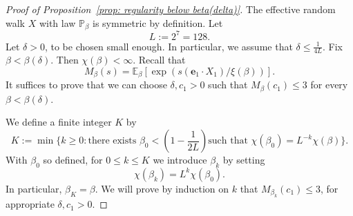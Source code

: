 \documentclass[10pt,a4paper]{amsart}
\begin{document}
\begin{proof}[Proof of Proposition~\textup{\ref{prop: regularity below beta(delta)}}]
The effective random walk $X$ with law $\mathbb P_\beta$ is symmetric by definition.
Let
\begin{equation}
    L:= 2^7 = 128.
    \end{equation}
Let $\delta>0$, to be chosen small enough. In particular, we assume that
$\delta\leq \frac{1}{4L}$.
Fix $\beta< \beta(\delta)$.  Then $\chi(\beta)<\infty$.
Recall that
\begin{equation}
    M_\beta(s)
    =
    \mathbb E_\beta[\exp(s( \mathbf{e}_1\cdot X_1)/\xi(\beta))].
\end{equation}
It suffices to prove that we can choose $\delta,c_1>0$ such
that $M_\beta(c_1)\leq 3$ for every $\beta< \beta(\delta)$.


We define a finite integer $K$ by
\begin{equation}
    K := \min\Big\{k \ge 0 : \text{there exists $\beta_0 < (1-\textstyle\frac{1}{2L})$
    such that $\chi(\beta_0)=L^{-k}\chi(\beta)$}\Big\}.
\end{equation}
With $\beta_0$ so defined, for $0 \le k \le K$ we introduce $\beta_k$ by setting
\begin{equation}
    \chi(\beta_k) = L^k \chi(\beta_0).
\end{equation}
In particular, $\beta_K=\beta$.
We will prove by induction on $k$ that $M_{\beta_k}(c_1) \le 3$,
for appropriate $\delta,c_1>0$.


\end{proof}
\end{document}
